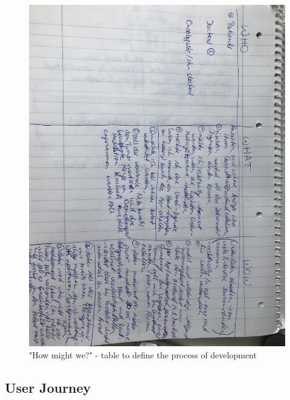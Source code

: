 \begin{figure}[h!]
	\centering
	\includegraphics[width=1\textwidth]{images/hills.jpg}
	\caption{"How might we?" - table to define the process of development}
	\label{verticallatter}
\end{figure}

\subsection{User Journey}

